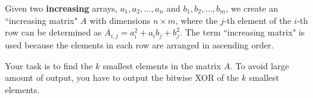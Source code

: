 Given two \textbf{increasing} arrays, $a_1, a_2,\ldots,a_n$ and $b_1,b_2,\ldots,b_m$,
we create an ``increasing matrix" $A$ with dimensions $n \times m$,
where the $j$-th element of the $i$-th row can be determined as $A_{i,j} = a_i^2 + a_ib_j + b_j^2$.
The term ``increasing matrix" is used because the elements in each row are arranged in ascending order. 

Your task is to find the $k$ smallest elements in the matrix $A$.
To avoid large amount of output, you have to output the bitwise XOR of the $k$ smallest elements.